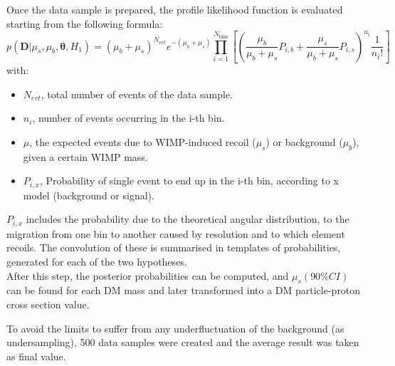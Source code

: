 \documentclass[physics,article,submit,moreauthors,pdftex]{Definitions/mdpi}
\begin{document}
Once the data sample is prepared, the profile likelihood function is evaluated starting from the following formula:
\begin{equation}
\label{eq:likelihood}
 p(\boldsymbol{D}|\mu_s,\mu_b,\boldsymbol{\theta},H_1)=(\mu_b+\mu_s)^{N_{evt}}e^{-(\mu_b+\mu_s)  }\prod_{i=1}^{N_{\text{bins}}} \left[ \left( \frac{\mu_b}{\mu_b+\mu_s}P_{i,b}+ \frac{\mu_s}{\mu_b+\mu_s}P_{i,s}\right)^{n_i}\frac{1}{n_i!}\right]
\end{equation}
with:
\begin{itemize}
    \item $N_{evt}$, total number of events of the data sample.
    \item $n_i$, number of events occurring in the i-th bin.
    \item $\mu$, the expected events due to WIMP-induced recoil ($\mu_s$) or background ($\mu_b$), given a certain WIMP mass.
    \item $P_{i,x}$, Probability of single event to end up in the i-th bin, according to x model (background or signal).
    
\end{itemize}
$P_{i,x}$ includes the probability due to the theoretical angular distribution, to the migration from one bin to another caused by resolution and to which element recoils. The convolution of these is summarised in templates of probabilities, generated for each of the two hypotheses.\\
After this step, the posterior probabilities can be computed, and $\mu_s(90\%CI)$ can be found for each DM mass and later transformed into a DM particle-proton cross section value.

To avoid the limits to suffer from any underfluctuation of the background (as undersampling), 500 data samples were created and the average result was taken as final value. 
\end{document}
